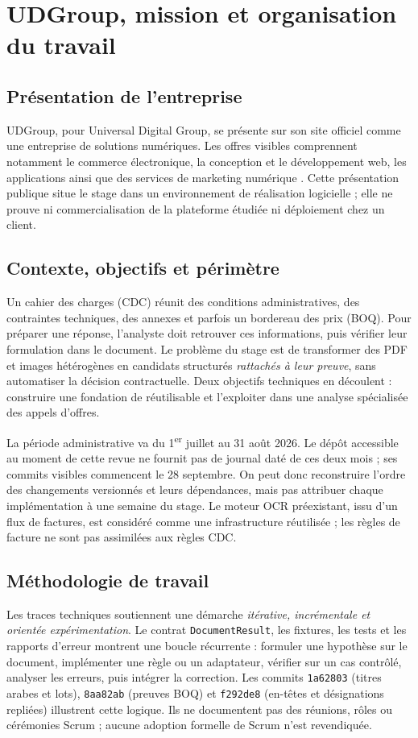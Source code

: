 \chapter{UDGroup, mission et organisation du travail}\label{chap:entreprise}
\section{Présentation de l'entreprise}
UDGroup, pour Universal Digital Group, se présente sur son site officiel comme une entreprise de solutions numériques. Les offres visibles comprennent notamment le commerce électronique, la conception et le développement web, les applications ainsi que des services de marketing numérique \cite{udgroup}. Cette présentation publique situe le stage dans un environnement de réalisation logicielle ; elle ne prouve ni commercialisation de la plateforme étudiée ni déploiement chez un client.

\section{Contexte, objectifs et périmètre}
Un cahier des charges (CDC) réunit des conditions administratives, des contraintes techniques, des annexes et parfois un bordereau des prix (BOQ). Pour préparer une réponse, l'analyste doit retrouver ces informations, puis vérifier leur formulation dans le document. Le problème du stage est de transformer des PDF et images hétérogènes en candidats structurés \emph{rattachés à leur preuve}, sans automatiser la décision contractuelle. Deux objectifs techniques en découlent : construire une fondation de \DI{} réutilisable et l'exploiter dans une analyse spécialisée des appels d'offres.

La période administrative va du 1\textsuperscript{er} juillet au 31 août 2026. Le dépôt accessible au moment de cette revue ne fournit pas de journal daté de ces deux mois ; ses commits visibles commencent le 28 septembre. On peut donc reconstruire l'ordre des changements versionnés et leurs dépendances, mais pas attribuer chaque implémentation à une semaine du stage. Le moteur OCR préexistant, issu d'un flux de factures, est considéré comme une infrastructure réutilisée ; les règles de facture ne sont pas assimilées aux règles CDC.

\section{Méthodologie de travail}
Les traces techniques soutiennent une démarche \emph{itérative, incrémentale et orientée expérimentation}. Le contrat \texttt{DocumentResult}, les fixtures, les tests et les rapports d'erreur montrent une boucle récurrente : formuler une hypothèse sur le document, implémenter une règle ou un adaptateur, vérifier sur un cas contrôlé, analyser les erreurs, puis intégrer la correction. Les commits \texttt{1a62803} (titres arabes et lots), \texttt{8aa82ab} (preuves BOQ) et \texttt{f292de8} (en-têtes et désignations repliées) illustrent cette logique. Ils ne documentent pas des réunions, rôles ou cérémonies Scrum ; aucune adoption formelle de Scrum n'est revendiquée.

